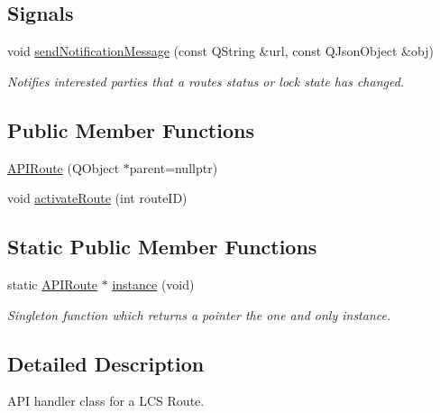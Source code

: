 \subsection*{Signals}
\begin{DoxyCompactItemize}
\item 
\mbox{\label{class_a_p_i_route_ad9db78abae10c20cbbec86378ba94db3}} 
void \hyperlink{class_a_p_i_route_ad9db78abae10c20cbbec86378ba94db3}{send\+Notification\+Message} (const Q\+String \&url, const Q\+Json\+Object \&obj)
\begin{DoxyCompactList}\small\item\em Notifies interested parties that a route\textquotesingle{}s status or lock state has changed. \end{DoxyCompactList}\end{DoxyCompactItemize}
\subsection*{Public Member Functions}
\begin{DoxyCompactItemize}
\item 
\hyperlink{class_a_p_i_route_ada8e5c770e397fc6ed6602bdbb670a29}{A\+P\+I\+Route} (Q\+Object $\ast$parent=nullptr)
\item 
void \hyperlink{class_a_p_i_route_ac110d1999b3afe409d6e341fb9ab06d6}{activate\+Route} (int route\+ID)
\end{DoxyCompactItemize}
\subsection*{Static Public Member Functions}
\begin{DoxyCompactItemize}
\item 
\mbox{\label{class_a_p_i_route_af7d8f762fc9a692118fb222ab1aa89a3}} 
static \hyperlink{class_a_p_i_route}{A\+P\+I\+Route} $\ast$ \hyperlink{class_a_p_i_route_af7d8f762fc9a692118fb222ab1aa89a3}{instance} (void)
\begin{DoxyCompactList}\small\item\em Singleton function which returns a pointer the one and only instance. \end{DoxyCompactList}\end{DoxyCompactItemize}


\subsection{Detailed Description}
A\+PI handler class for a L\+CS Route. 

